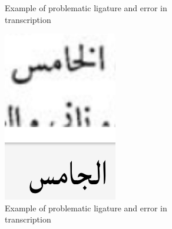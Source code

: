 \begin{figure}[!ht]
\begin{subfigure}[b]{0.3\linewidth}
	\caption{Example of problematic ligature and error in transcription}
	\label{fig3:fig9}
	\end{subfigure}
	\begin{subfigure}[b]{0.3\linewidth}
	\centering
	\includegraphics[width=\linewidth]{images/image23.png}
	\caption{Example of problematic ligature and error in transcription}
	\label{fig3:fig10}
	\end{subfigure}
	\begin{subfigure}[b]{0.3\linewidth}
	\centering

\end{subfigure}
\end{figure}
